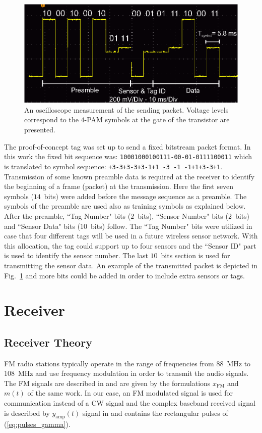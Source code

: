 \documentclass[journal]{IEEEtran}
\begin{document}
%
\begin{figure}[t]
\centering
\includegraphics[width=1\columnwidth]{Figures/Fig7.eps}
\caption{An oscilloscope measurement of the sending packet.  Voltage levels correspond to the $4$-PAM symbols at the gate of the transistor are presented.}
\label{fig:packet_tag}
\end{figure}

The proof-of-concept tag  was set up to send a fixed bitstream packet format. 
%
In this work the fixed  bit sequence was: \texttt{10001000100111-00-01-0111100011} which is translated to 
symbol sequence: \texttt{+3-3+3-3+3-1+1 -3 -1 -1+1+3-3+1}.
%
Transmission of some known
preamble data is required at the receiver to identify the beginning of a frame (packet) at the  transmission. 
%
Here the first seven symbols ($14$~bits) were added before the message sequence as a preamble.
%
The symbols of the preamble are used also  as training symbols as explained below.
%
After the preamble, ``Tag Number" bits ($2$~bits),  ``Sensor Number" bits ($2$~bits) and   ``Sensor Data" bits ($10$~bits) follow. 
%
The  ``Tag Number" bits  were utilized in case that four different  tags will be used in a future wireless sensor network.
%
With this allocation, the tag could support up to four sensors and  the ``Sensor ID" part is used to identify the sensor number.
The last $10$~bits section is used for transmitting the sensor data. 
%
An example of the  transmitted packet is depicted in Fig.~\ref{fig:packet_tag} and more bits could be added   in order to include extra sensors or tags.  
%


%
\section{Receiver}
\label{Sec:receiver}
\subsection{Receiver Theory}
%
FM radio stations typically operate in the range of frequencies from $88$~MHz to $108$~MHz and use frequency modulation in order to transmit the audio signals.
%
The FM  signals are described in \cite{daskalakis2017ambient}  and are given by the formulations $x_\text{FM}$  and $m(t)$ of the same work.
%
In our case, an FM modulated signal is used for communication instead of a CW signal and the complex baseband received signal is described by $y_\text{amp}(t)$ signal in \cite{daskalakis2017ambient} and  contains the rectangular pulses of  (\ref{eq:pulses_gamma}).
\end{document}
